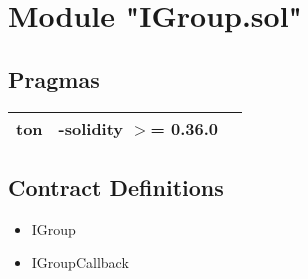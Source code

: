 
\section{Module "IGroup.sol"}


\subsection{Pragmas}


\noindent\begin{tabular}{|l|l|p{5cm}|}\hline
ton & -solidity $>$= 0.36.0 &\\\hline
\end{tabular}


\subsection{Contract Definitions}

\begin{itemize}
\item IGroup
\item IGroupCallback
\end{itemize}
